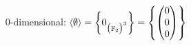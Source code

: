 \documentclass{scrreprt}
\newcommand\hull[1]{\left\langle #1 \right\rangle}
\begin{document}
\begin{enumerate}[(a)]
\begin{itemize}
  \item[$0$-dimensional:]
    $\hull{\emptyset} = \qty{0_{\qty\big(\mathbb{F}_2)^3}}
    = \qty{\begin{pmatrix} 0 \\ 0 \\ 0 \end{pmatrix}}$
  \end{itemize}
\end{enumerate}
\end{document}
